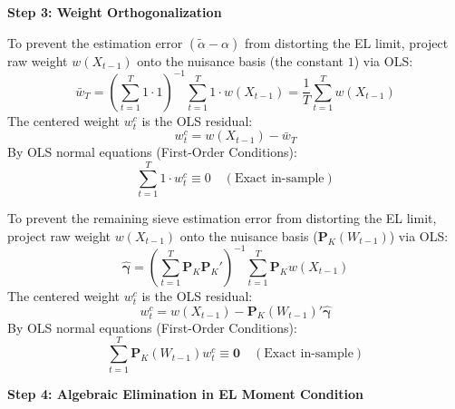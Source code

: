 \documentclass[11pt,landscape]{article}
\begin{document}
\vspace{1em}
\noindent\hrulefill
\vspace{1em}

\noindent\textbf{\large Step 3: Weight Orthogonalization} \vspace{0.5em}

\noindent
\begin{minipage}[t]{0.48\textwidth}
To prevent the estimation error $(\widetilde{\alpha} - \alpha)$ from distorting the EL limit, project raw weight $w(X_{t-1})$ onto the nuisance basis (the constant $1$) via OLS:
\begin{equation}
    \bar{w}_T = \left( \sum_{t=1}^T 1 \cdot 1 \right)^{-1} \sum_{t=1}^T 1 \cdot w(X_{t-1}) = \frac{1}{T}\sum_{t=1}^T w(X_{t-1})
\end{equation}
The centered weight $w^c_t$ is the OLS residual:
\begin{equation}
    w^c_t = w(X_{t-1}) - \bar{w}_T
\end{equation}
By OLS normal equations (First-Order Conditions):
\begin{equation}
    \sum_{t=1}^T 1 \cdot w^c_t \equiv 0 \quad (\text{Exact in-sample})
\end{equation}
\end{minipage}%
\hfill
\begin{minipage}[t]{0.48\textwidth}
To prevent the remaining sieve estimation error from distorting the EL limit, project raw weight $w(X_{t-1})$ onto the nuisance basis ($\bm{P}_K(W_{t-1})$) via OLS:
\begin{equation}
    \widehat{\bm{\gamma}} = \left( \sum_{t=1}^T \bm{P}_K \bm{P}_K' \right)^{-1} \sum_{t=1}^T \bm{P}_K w(X_{t-1})
\end{equation}
The centered weight $w^c_t$ is the OLS residual:
\begin{equation}
    w^c_t = w(X_{t-1}) - \bm{P}_K(W_{t-1})'\widehat{\bm{\gamma}}
\end{equation}
By OLS normal equations (First-Order Conditions):
\begin{equation}
    \sum_{t=1}^T \bm{P}_K(W_{t-1}) w^c_t \equiv \bm{0} \quad (\text{Exact in-sample})
\end{equation}
\end{minipage}

\vspace{1em}
\noindent\hrulefill
\vspace{1em}

\noindent\textbf{\large Step 4: Algebraic Elimination in EL Moment Condition} \vspace{0.5em}
\end{document}
